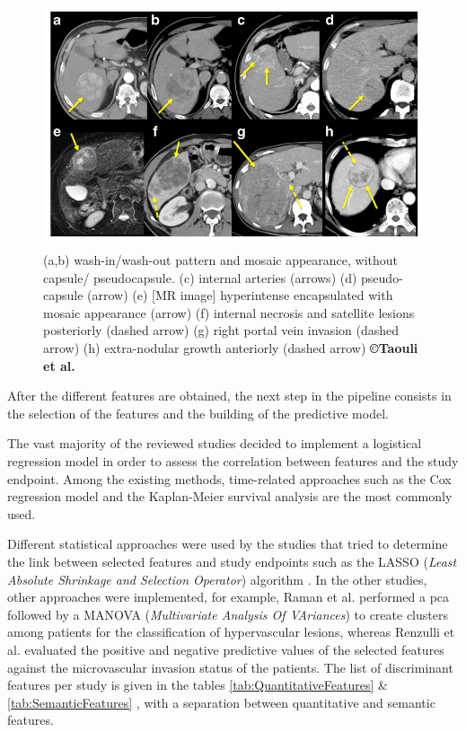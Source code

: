 \begin{figure}[ht!]
\centering
\includegraphics[width=4.67498in,height=2.86979in]{./images/image8.png}
\caption{
(a,b) wash-in/wash-out pattern and mosaic appearance, without capsule/
pseudocapsule.
(c) internal arteries (arrows)
(d) pseudo-capsule (arrow)
(e) {[}MR image{]} hyperintense encapsulated with mosaic appearance
(arrow)
(f) internal necrosis and satellite lesions posteriorly (dashed arrow)
(g) right portal vein invasion (dashed arrow)
(h) extra-nodular growth anteriorly (dashed arrow)
\textbf{©Taouli et al.} \cite{Taouli2017}
}
\label{Taouli_imagingTraits}
\end{figure}


After the different features are obtained, the next step in the pipeline
consists in the selection of the features and the building of the
predictive model.

The vast majority of the reviewed studies decided to implement a
logistical regression model in order to assess the correlation between
features and the study endpoint. Among the existing methods,
time-related approaches such as the Cox regression model \cite{Li2016,Banerjee2015,Zheng2018,Cozzi2017,Xia2018} and the Kaplan-Meier survival analysis
\cite{Segal2007,Chen2017,Akai2018,Xia2018} are the most commonly used.

Different statistical approaches were used by the studies that tried to
determine the link between selected features and study endpoints such as
the LASSO (\emph{Least Absolute Shrinkage and Selection Operator})
algorithm \cite{Zhou2017a,Peng2018,Bakr2017}. In the other studies, other
approaches were implemented, for example, Raman et al.
performed a \ac{pca} followed by a
MANOVA (\emph{Multivariate Analysis Of VAriances}) to create clusters
among patients for the classification of hypervascular lesions, whereas
Renzulli et al. evaluated the positive and negative predictive
values of the selected features against the microvascular invasion
status of the patients.
The list of discriminant features per study is given in the tables \ref{tab:QuantitativeFeatures}
 \& \ref{tab:SemanticFeatures} , with a separation between quantitative and semantic features.

